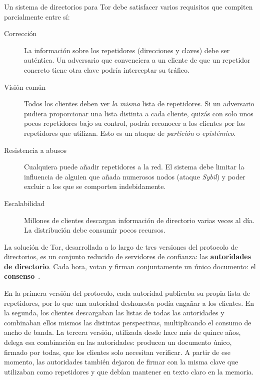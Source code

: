 Un sistema de directorios para Tor debe satisfacer varios requisitos que compiten parcialmente entre sí:
\begin{description}
  \item[Corrección] La información sobre los repetidores (direcciones y claves) debe ser auténtica. Un adversario que convenciera a un cliente de que un repetidor concreto tiene otra clave podría interceptar su tráfico.
  \item[Visión común] Todos los clientes deben ver \emph{la misma} lista de repetidores. Si un adversario pudiera proporcionar una lista distinta a cada cliente, quizás con solo unos pocos repetidores bajo su control, podría reconocer a los clientes por los repetidores que utilizan. Esto es un ataque de \emph{partición} o \emph{epistémico}.
  \item[Resistencia a abusos] Cualquiera puede añadir repetidores a la red. El sistema debe limitar la influencia de alguien que añada numerosos nodos (ataque \emph{Sybil}) y poder excluir a los que se comporten indebidamente.
  \item[Escalabilidad] Millones de clientes descargan información de directorio varias veces al día. La distribución debe consumir pocos recursos.
\end{description}

La solución de Tor, desarrollada a lo largo de tres versiones del protocolo de directorios, es un conjunto reducido de servidores de confianza: las \textbf{autoridades de directorio}. Cada hora, votan y firman conjuntamente un único documento: el \textbf{consenso}~.

\begin{storia}
En la primera versión del protocolo, cada autoridad publicaba su propia lista de repetidores, por lo que una autoridad deshonesta podía engañar a los clientes. En la segunda, los clientes descargaban las listas de todas las autoridades y combinaban ellos mismos las distintas perspectivas, multiplicando el consumo de ancho de banda. La tercera versión, utilizada desde hace más de quince años, delega esa combinación en las autoridades: producen un documento único, firmado por todas, que los clientes solo necesitan verificar. A partir de ese momento, las autoridades también dejaron de firmar con la misma clave que utilizaban como repetidores y que debían mantener en texto claro en la memoria.
\end{storia}

